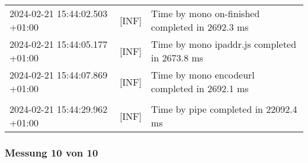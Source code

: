 {{\begin{tabularx}{\textwidth}{|l|l|X|}
                    2024-02-21 15:44:02.503 +01:00 & [INF] & Time by mono on-finished completed in 2692.3 ms \\
                    2024-02-21 15:44:05.177 +01:00 & [INF] & Time by mono ipaddr.js completed in 2673.8 ms \\
                    2024-02-21 15:44:07.869 +01:00 & [INF] & Time by mono encodeurl completed in 2692.1 ms \\
                    & & \\
                    2024-02-21 15:44:29.962 +01:00 & [INF] & Time by pipe completed in 22092.4 ms \\
                    \hline
                \end{tabularx}
            }
        }

    \subsubsection*{Messung 10 von 10} \label{subsubsec:LiteDbMehrPaketeAlsDb10von10}
